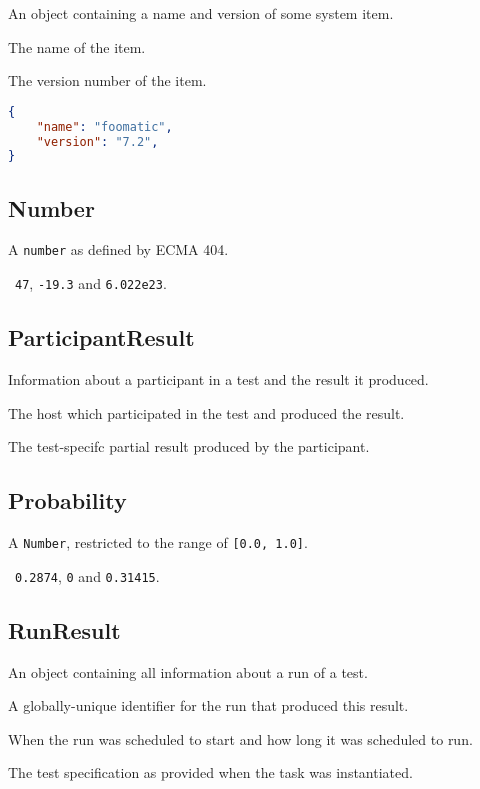 \documentclass[10pt]{article}
\begin{document}
An object containing a name and version of some system item.

 The name of the item.

 The version number of the item.

\example
\begin{lstlisting}[language=json]
{
    "name": "foomatic",
    "version": "7.2",
}
\end{lstlisting}



\subsection{Number}
A {\tt number} as defined by ECMA 404.

\example\ {\tt 47}, {\tt -19.3} and {\tt 6.022e23}.



\subsection{ParticipantResult}
Information about a participant in a test and the result it produced.

 The host which participated in the test
and produced the result.

 The test-specifc partial result produced
by the participant.



\subsection{Probability}
A {\tt Number}, restricted to the range of {\tt [0.0, 1.0]}.

\example\ {\tt 0.2874}, {\tt 0} and {\tt 0.31415}.


\subsection{RunResult}
An object containing all information about a run of a test.

 A globally-unique identifier for the run that
produced this result.

 When the run was scheduled to start
and how long it was scheduled to run.

 The test specification as provided
when the task was instantiated.
\end{document}

